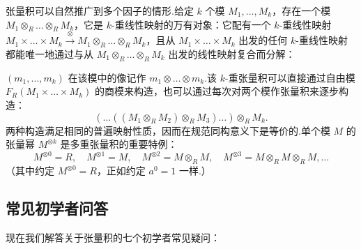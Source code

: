张量积可以自然推广到多个因子的情形.给定 $k$ 个模 $M_1, \dots, M_k$，存在一个模 $M_1 \otimes_R \dots \otimes_R M_k$，它是 $k$-重线性映射的万有对象：它配有一个 $k$-重线性映射 $M_1 \times \dots \times M_k \xrightarrow{\otimes} M_1 \otimes_R \dots \otimes_R M_k$，且从 $M_1 \times \dots \times M_k$ 出发的任何 $k$-重线性映射都能唯一地通过与从 $M_1 \otimes_R \dots \otimes_R M_k$ 出发的线性映射复合而分解：
\begin{center}
\end{center}
$(m_1, \dots, m_k)$ 在该模中的像记作 $m_1 \otimes \dots \otimes m_k$.该 $k$-重张量积可以直接通过自由模 $F_R(M_1 \times \dots \times M_k)$ 的商模来构造，也可以通过每次对两个模作张量积来逐步构造：
\[
  (\dots((M_1 \otimes_R M_2) \otimes_R M_3) \dots) \otimes_R M_k.
\]
两种构造满足相同的普遍映射性质，因而在规范同构意义下是等价的.单个模 $M$ 的张量幂 $M^{\otimes k}$ 是多重张量积的重要特例：
\[
  M^{\otimes 0} = R, \quad M^{\otimes 1} = M, \quad M^{\otimes 2} = M \otimes_R M, \quad M^{\otimes 3} = M \otimes_R M \otimes_R M, \dots
\]
（其中约定 $M^{\otimes 0} = R$，正如约定 $a^0 = 1$ 一样.）

\subsection*{常见初学者问答}

现在我们解答关于张量积的七个初学者常见疑问：

